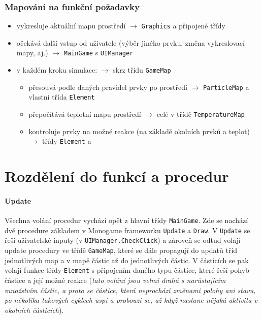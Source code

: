 \documentclass[a4paper, 12pt]{article}
\begin{document}
\subsubsection{Mapování na funkční požadavky}
\begin{itemize}
    \item vykresluje aktuální mapu prostředí \(\rightarrow\) \texttt{Graphics} a připojené
        třídy
    \item očekává další vstup od uživatele (výběr jiného prvku, změna
        vykreslovací mapy, aj.) \(\rightarrow\) \texttt{MainGame} s \texttt{UIManager}
    \item v každém kroku simulace: \(\rightarrow\) skrz třídu \texttt{GameMap}
        \begin{itemize}
            \item přesouvá podle daných pravidel prvky po prostředí \(\rightarrow\)
                \texttt{ParticleMap} a vlastní třída \texttt{Element}
            \item přepočítává teplotní mapu prostředí \(\rightarrow\) celé v třídě
                \texttt{TemperatureMap}
            \item kontroluje prvky na možné reakce (na základě okolních prvků a
                teplot) \(\rightarrow\) třídy \texttt{Element} a \texttt{}
        \end{itemize}
\end{itemize}

\section{Rozdělení do funkcí a procedur}
\paragraph{Update}
Všechna volání procedur vychází opět z hlavní třídy \texttt{MainGame}.
Zde se nachází dvě procedure základem v Monogame frameworku \texttt{Update} a
\texttt{Draw}. V \texttt{Update} se řeší uživatelské inputy (v
\texttt{UIManager.CheckClick}) a zároveň se odtud volají update procedury ve třídě
\texttt{GameMap}, které se dále propagují do updatů tříd jednotlivých map a v
mapě částic až do jednotlivých částic. V částicích se pak volají funkce třídy
\texttt{Element} s připojením daného typu částice, které řeší pohyb částice a
její možné reakce (\emph{tato volání jsou velmi drahá s narůstajícím množstvím
    částic, a proto se částice, která neprochází změnami polohy ani stavu, po 
    několika takových cyklech uspí a probouzí se, až když nastane nějaká aktivita v okolních částicích}).
\end{document}
